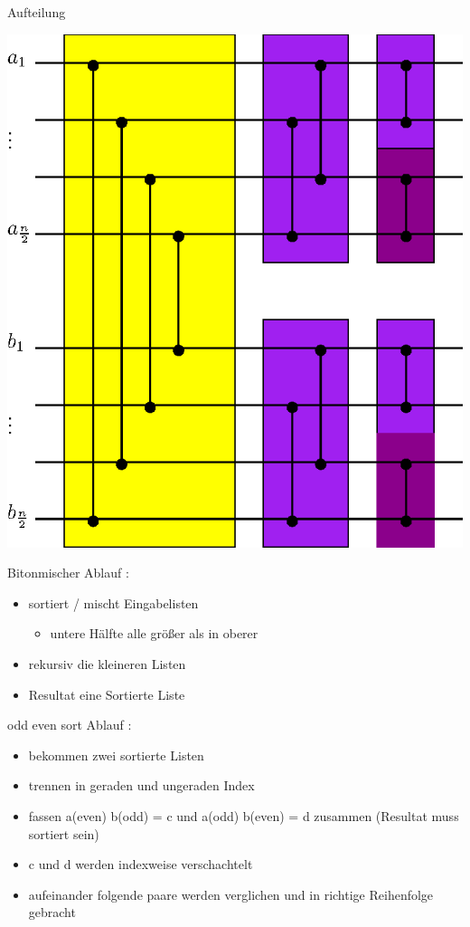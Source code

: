 \documentclass[ucs,9pt]{beamer}
\begin{document}
\begin{frame}{Aufteilung}
\begin{center}
\includegraphics[scale=0.6]{bitonmischer.eps}
\end{center}
\end{frame}

\begin{frame}{Bitonmischer}
Ablauf :
\begin{itemize}
\item sortiert / mischt Eingabelisten
	\begin{itemize}
	\item untere Hälfte alle größer als in oberer
	\end{itemize}
\item rekursiv die kleineren Listen 
\item Resultat eine Sortierte Liste
\end{itemize}
\end{frame}

\begin{frame}{odd even sort}
Ablauf :
\begin{itemize}
\item bekommen zwei sortierte Listen
\item trennen in geraden und ungeraden Index
\item fassen a(even) b(odd) = c und a(odd) b(even) = d zusammen (Resultat muss sortiert sein)
\item c und d werden indexweise verschachtelt
\item aufeinander folgende paare werden verglichen und in richtige Reihenfolge gebracht
\end{itemize}
\end{frame}
\end{document}
